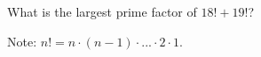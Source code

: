 What is the largest prime factor of $18! + 19!$?



Note: $n! = n \cdot (n - 1) \cdot  ... \cdot 2 \cdot1.$
